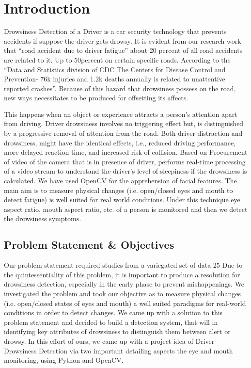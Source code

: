 \documentclass{article}
\begin{document}
\tableofcontents

\newpage


\section{Introduction}
Drowsiness Detection of a Driver is a car security technology that prevents accidents if suppose the driver gets drowsy. It is evident from our research work that “road accident due to driver fatigue” about 20 percent of all road accidents are related to it. Up to 50percent on certain speciﬁc roads. 
According to the “Data and Statistics division of CDC {The Centers for Disease Control and Prevention}- 76k injuries and 1.2k deaths annually is related to unattentive reported crashes”. Because of this hazard that drowsiness possess on the road, new ways necessitates to be produced for oﬀsetting its aﬀects. 

This happens when an object or experience attracts a person’s attention apart from driving. Driver drowsiness involves no triggering eﬀect but, is distinguished by a progressive removal of attention from the road. Both driver distraction and drowsiness, might have the identical eﬀects, i.e., reduced driving performance, more delayed reaction time, and increased risk of collision. Based on Procurement of video of the camera that is in presence of driver, performs real-time processing of a video stream to understand the driver’s level of sleepiness if the drowsiness is calculated. We have used OpenCV for the apprehension of facial features. The main aim is to measure physical changes (i.e. open/closed eyes and mouth to detect fatigue) is well suited for real world conditions. Under this technique eye aspect ratio, mouth aspect ratio, etc. of a person is monitored and then we detect the drowsiness symptoms.

\newpage
 \subsection{Problem Statement \& Objectives}
Our problem statement required studies from a variegated set of data 25%
Due to the quintessentiality of this problem, it is important to produce a resolution for drowsiness detection, especially in the early phase to prevent mishappenings. 
We investigated the problem and took our objective as to measure physical changes (i.e. open/closed states of eyes and mouth) a well suited paradigms for real-world conditions in order to detect changes. 
We came up with a solution to this problem statement and decided to build a detection system, that will in identifying key attributes of drowsiness to distinguish them between alert or drowsy. 
In this effort of ours, we came up with a project idea of Driver Drowsiness Detection via two important detailing aspects the eye and mouth monitoring, using Python and OpenCV.
\end{document}
